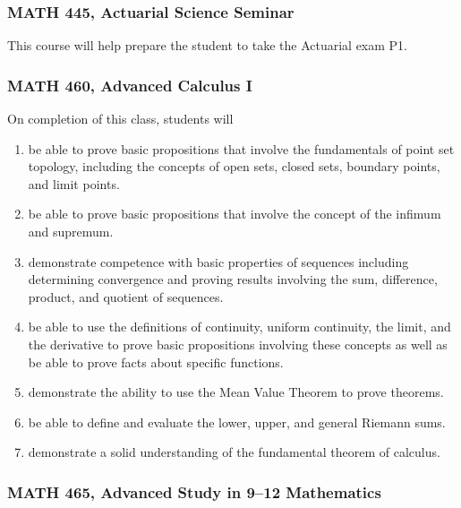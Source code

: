 \documentclass[10pt]{article}
\newenvironment{alphalist}{
\begin{enumerate}[label=(\arabic*),widest=107 ,leftmargin=25pt, itemsep=0pt]}
{\end{enumerate}}
\begin{document}
\subsubsection*{MATH 445, Actuarial Science Seminar}

This course will help prepare the student to take the Actuarial exam P1.

\subsubsection*{MATH 460, Advanced Calculus I}

On completion of this class, students will
\begin{alphalist}
    \item be able to prove basic propositions that involve the fundamentals of point set topology, including the concepts of open sets, closed sets, boundary points, and limit points.
     \item be able to prove basic propositions that involve the concept of the infimum and supremum. 
    \item demonstrate competence with basic properties of sequences including determining convergence and proving results involving the sum, difference, product, and quotient of sequences.
    \item be able to use the definitions of continuity, uniform continuity, the limit, and the derivative to prove basic propositions involving these concepts as well as be able to prove facts about specific functions.
    \item demonstrate the ability to use the Mean Value Theorem to prove theorems. 
    \item be able to define and evaluate the lower, upper, and general Riemann sums.
    \item demonstrate a solid understanding of the fundamental theorem of calculus.
\end{alphalist}

\subsubsection*{MATH 465, Advanced Study in 9--12 Mathematics}
\end{document}
